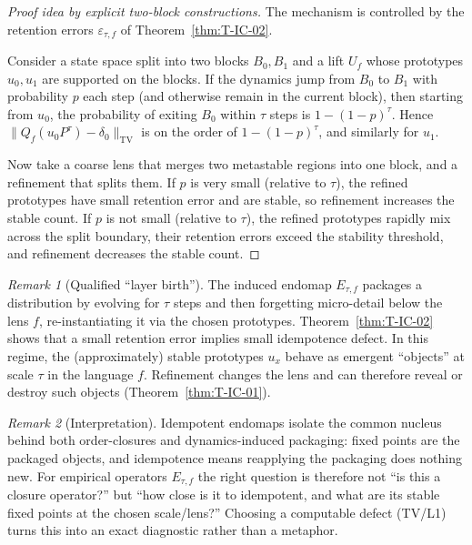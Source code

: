 \documentclass[11pt]{article}
\theoremstyle{remark}
\newtheorem{remark}{Remark}
\begin{document}
\begin{proof}[Proof idea by explicit two-block constructions]
The mechanism is controlled by the retention errors $\varepsilon_{\tau,f}$ of
Theorem~\ref{thm:T-IC-02}.

Consider a state space split into two blocks $B_0,B_1$ and a lift $U_f$ whose prototypes
$u_0,u_1$ are supported on the blocks. If the dynamics jump from $B_0$ to $B_1$ with
probability $p$ each step (and otherwise remain in the current block), then starting from $u_0$,
the probability of exiting $B_0$ within $\tau$ steps is $1-(1-p)^\tau$.
Hence $\|Q_f(u_0P^\tau)-\delta_0\|_{\mathrm{TV}}$ is on the order of $1-(1-p)^\tau$,
and similarly for $u_1$.

Now take a coarse lens that merges two metastable regions into one block, and a refinement that
splits them. If $p$ is very small (relative to $\tau$), the refined prototypes have small
retention error and are stable, so refinement increases the stable count.
If $p$ is not small (relative to $\tau$), the refined prototypes rapidly mix across the split
boundary, their retention errors exceed the stability threshold, and refinement decreases the
stable count.  \qedhere
\end{proof}

\begin{remark}[Qualified ``layer birth'']
The induced endomap $E_{\tau,f}$ packages a distribution by evolving for $\tau$ steps and then
forgetting micro-detail below the lens $f$, re-instantiating it via the chosen prototypes.
Theorem~\ref{thm:T-IC-02} shows that a small retention error implies small idempotence defect.
In this regime, the (approximately) stable prototypes $u_x$ behave as emergent ``objects'' at
scale $\tau$ in the language $f$.
Refinement changes the lens and can therefore reveal or destroy such objects
(Theorem~\ref{thm:T-IC-01}).
\end{remark}

\begin{remark}[Interpretation]
Idempotent endomaps isolate the common nucleus behind both order-closures and dynamics-induced packaging: fixed points are the packaged objects, and idempotence means reapplying the packaging does nothing new.
For empirical operators $E_{\tau,f}$ the right question is therefore not ``is this a closure operator?'' but ``how close is it to idempotent, and what are its stable fixed points at the chosen scale/lens?''
Choosing a computable defect (TV/L1) turns this into an exact diagnostic rather than a metaphor.
\end{remark}
\end{document}
